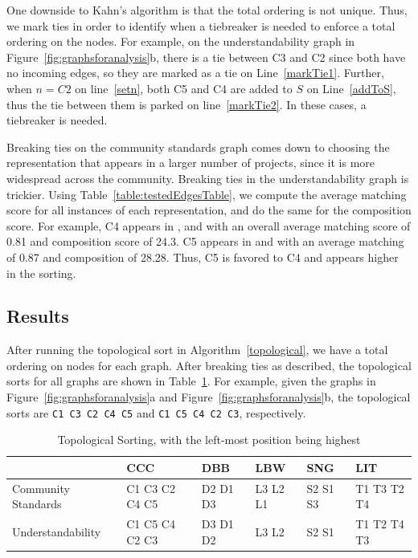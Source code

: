 One downside to Kahn's algorithm is that the total ordering is not unique. Thus, we mark ties in order to identify when a tiebreaker is needed to enforce a total ordering on the nodes. For example, on the understandability graph in Figure~\ref{fig:graphsforanalysis}b, there is a tie between C3 and C2 since both have no incoming edges, so they are marked as a tie on Line~\ref{markTie1}. Further, when $n=C2$ on line~\ref{setn}, both C5 and C4 are added to $S$ on Line~\ref{addToS}, thus the tie between them is parked on line~\ref{markTie2}. In these cases, a tiebreaker is needed.

Breaking ties on the community standards graph comes down to choosing the representation that appears in a larger number of projects, since it is more widespread across the community. Breaking ties in the understandability graph is trickier. Using Table~\ref{table:testedEdgesTable}, we compute the average matching score for all instances of each representation, and do the same for the composition score. For example, C4 appears in ,  and  with an overall average matching score of 0.81 and composition score of 24.3. C5 appears in  and  with an average matching of 0.87 and composition of 28.28. Thus, C5 is favored to C4 and appears higher in the sorting.

\subsection{Results}
After running the topological sort in Algorithm~\ref{topological}, we have a total ordering on nodes for each graph. After breaking ties as described, the topological sorts for all graphs are shown in Table~\ref{topologicalResults}.  For example, given the graphs in Figure~\ref{fig:graphsforanalysis}a and Figure~\ref{fig:graphsforanalysis}b, the topological sorts are {\tt C1 C3 C2 C4 C5} and {\tt C1 C5 C4 C2 C3}, respectively.

\begin{table}
\centering
\caption{Topological Sorting, with the left-most position being highest \label{topologicalResults}}
\begin{tabular}{|| l || l || l || l || l || l ||}
				& CCC			& DBB 		& LBW & SNG & LIT \\ \hline
Community Standards		& C1 C3 C2 C4 C5 	& D2 D1 D3	&  L3 L2 L1 	& S2 S1 S3 	& T1 T3 T2 T4 \\
Understandability 			& C1 C5 C4 C2 C3 	& D3 D1 D2 	& L3 L2		& S2 S1		& T1 T2 T4 T3 \\
\end{tabular}
\end{table}




